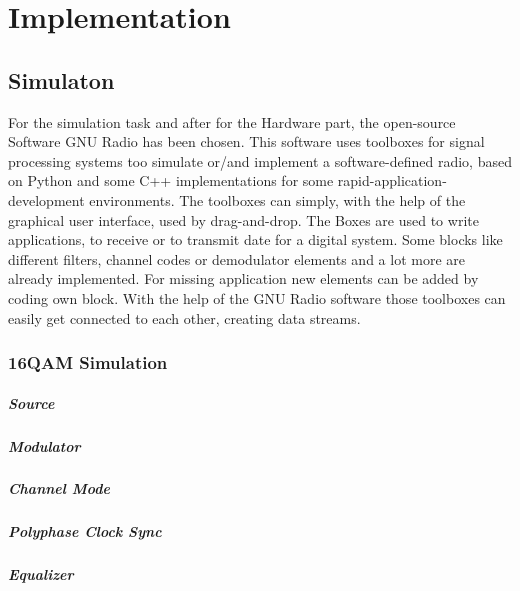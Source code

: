 
\chapter{Implementation}

\section{Simulaton}

For the simulation task and after for the Hardware part, the open-source Software GNU Radio has been chosen. This software uses toolboxes for signal processing systems too simulate or/and implement a software-defined radio, based on Python and some C++ implementations for some rapid-application-development environments. The toolboxes can simply, with the help of the graphical user interface, used by drag-and-drop. The Boxes are used to write applications, to receive or to transmit date for a digital system. Some blocks like different filters, channel codes or demodulator elements and a lot more are already implemented. For missing application new elements can be added by coding own block. With the help of the GNU Radio software those toolboxes can easily get connected to each other, creating data streams. 


\subsection{16QAM Simulation}

\paragraph{Source}

\paragraph{Modulator}

\paragraph{Channel Mode}

\paragraph{Polyphase Clock Sync}

\paragraph{Equalizer}

